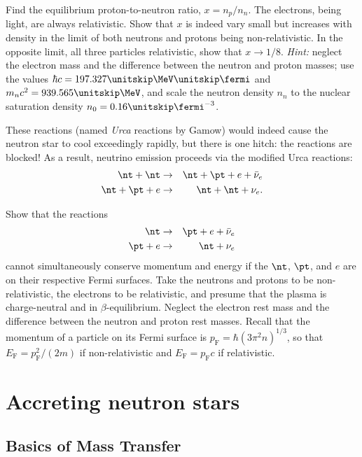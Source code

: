 \begin{exercisebox}
 Find the equilibrium proton-to-neutron ratio, $x = n_{p}/n_{n}$.  The electrons, being light, are always relativistic.  Show that $x$ is indeed vary small but increases with density in the limit of both neutrons and protons being non-relativistic. In the opposite limit, all three particles relativistic, show that $x\to 1/8$.  \emph{Hint:} neglect the electron mass and the difference between the neutron and proton masses; use the values $\hbar c = 197.327\nsp\MeV\usp\fermi$ and $m_{n}c^{2} = 939.565\nsp\MeV$, and scale the neutron density $n_{n}$ to the nuclear saturation density $n_{0}= 0.16\nsp\fermi^{-3}$.
\end{exercisebox}

These reactions (named \emph{Urca} reactions by Gamow) would indeed cause the neutron star to cool exceedingly rapidly, but there is one hitch: the reactions are blocked!  As a result, neutrino emission proceeds via the modified Urca reactions:
\begin{eqnarray}
\nt+\nt &\to& \nt + \pt + e + \bar{\nu}_{e}\\
\nt + \pt + e &\to& \nt + \nt + \nu_{e}.
\end{eqnarray}

\begin{exercisebox}
Show that the reactions
\begin{eqnarray*}
\nt &\to& \pt + e + \bar{\nu}_{e}\\
\pt +e &\to& \nt + \nu_{e}
\end{eqnarray*}
cannot simultaneously conserve momentum and energy if the $\nt$, $\pt$, and $e$ are on their respective Fermi surfaces.  Take the neutrons and protons to be non-relativistic, the electrons to be relativistic, and presume that the plasma is charge-neutral and in $\beta$-equilibrium. Neglect the electron rest mass and the difference between the neutron and proton rest masses.  Recall that the momentum of a particle on its Fermi surface is $p_{\mathrm{F}} = \hbar(3\pi^{2} n)^{1/3}$, so that $E_{\mathrm{F}} = p_{\mathrm{F}}^{2}/(2m)$ if non-relativistic and $E_{\mathrm{F}} = p_{\mathrm{F}}c$ if relativistic.
\end{exercisebox}

\section{Accreting neutron stars}

\subsection{Basics of Mass Transfer}\label{s.mass-transfer}

